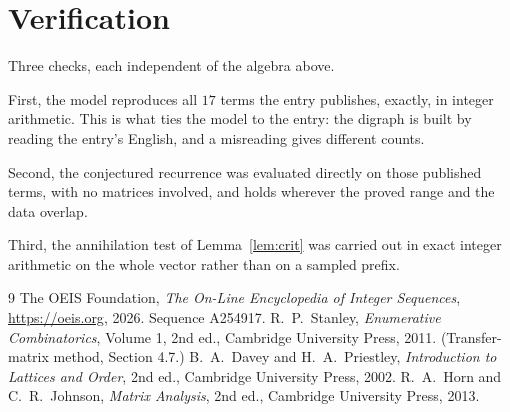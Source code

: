 \documentclass[11pt,a4paper]{article}
\theoremstyle{plain}
\theoremstyle{definition}
\begin{document}
\section{Verification}

Three checks, each independent of the algebra above.

First, the model reproduces all $17$ terms the entry publishes, exactly, in integer
arithmetic. This is what ties the model to the entry: the digraph is built by reading the
entry's English, and a misreading gives different counts.

Second, the conjectured recurrence was evaluated directly on those published terms, with no
matrices involved, and holds wherever the proved range and the data overlap.

Third, the annihilation test of Lemma~\ref{lem:crit} was carried out in exact integer
arithmetic on the whole vector rather than on a sampled prefix.

\begin{thebibliography}{9}
 The OEIS Foundation, \emph{The On-Line Encyclopedia of Integer
Sequences}, \url{https://oeis.org}, 2026. Sequence A254917.
 R.~P.~Stanley, \emph{Enumerative Combinatorics}, Volume 1, 2nd ed.,
Cambridge University Press, 2011. (Transfer-matrix method, Section 4.7.)
 B.~A.~Davey and H.~A.~Priestley, \emph{Introduction to Lattices and
Order}, 2nd ed., Cambridge University Press, 2002.
 R.~A.~Horn and C.~R.~Johnson, \emph{Matrix Analysis}, 2nd ed., Cambridge
University Press, 2013.
\end{thebibliography}
\end{document}
